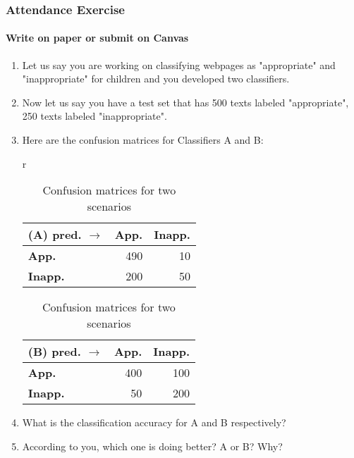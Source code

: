 \documentclass{beamer}
\begin{document}
\begin{frame}
\frametitle{Attendance Exercise}
\framesubtitle{Write on paper or submit on Canvas}
\begin{enumerate}
\item Let us say you are working on classifying webpages as "appropriate" and "inappropriate" for children and you developed two classifiers. 
\item Now let us say you have a test set that has 500 texts labeled "appropriate", 250 texts labeled "inappropriate".
\item Here are the confusion matrices for Classifiers A and B: \\
\begin{table}[h]
\begin{center}
\begin{tabular}{r}
  \begin{tabular}{|l|r|r|}
    \hline
    (A) pred. $\rightarrow$&\textbf{App.}&\textbf{Inapp.}\\
    \hline
    \textbf{App.}&490&10\\ \hline
    \textbf{Inapp.}&200&50\\ \hline
    \end{tabular}
  \begin{tabular}{|l|r|r|}
    \hline
    (B) pred. $\rightarrow$&\textbf{App.}&\textbf{Inapp.}\\
    \hline
    \textbf{App.}&400&100\\ \hline
    \textbf{Inapp.}&50&200\\ \hline
    \end{tabular}
\end{tabular}
\caption{Confusion matrices for two scenarios}
\end{center}
\end{table}
\item What is the classification accuracy for A and B respectively?
\item According to you, which one is doing better? A or B? Why? 
\end{enumerate}
\end{frame}
\end{document}
